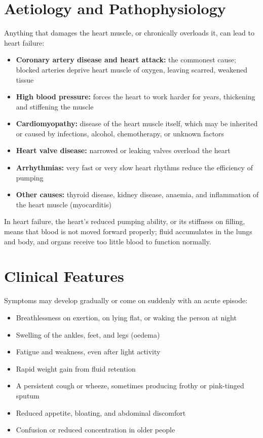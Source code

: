 \section*{Aetiology and Pathophysiology}
Anything that damages the heart muscle, or chronically overloads it, can lead to heart failure:
\begin{itemize}
    \item \textbf{Coronary artery disease and heart attack:} the commonest cause; blocked arteries deprive heart muscle of oxygen, leaving scarred, weakened tissue
    \item \textbf{High blood pressure:} forces the heart to work harder for years, thickening and stiffening the muscle
    \item \textbf{Cardiomyopathy:} disease of the heart muscle itself, which may be inherited or caused by infections, alcohol, chemotherapy, or unknown factors
    \item \textbf{Heart valve disease:} narrowed or leaking valves overload the heart
    \item \textbf{Arrhythmias:} very fast or very slow heart rhythms reduce the efficiency of pumping
    \item \textbf{Other causes:} thyroid disease, kidney disease, anaemia, and inflammation of the heart muscle (myocarditis)
\end{itemize}
In heart failure, the heart's reduced pumping ability, or its stiffness on filling, means that blood is not moved forward properly; fluid accumulates in the lungs and body, and organs receive too little blood to function normally.

\section*{Clinical Features}
Symptoms may develop gradually or come on suddenly with an acute episode:
\begin{itemize}
    \item Breathlessness on exertion, on lying flat, or waking the person at night
    \item Swelling of the ankles, feet, and legs (oedema)
    \item Fatigue and weakness, even after light activity
    \item Rapid weight gain from fluid retention
    \item A persistent cough or wheeze, sometimes producing frothy or pink-tinged sputum
    \item Reduced appetite, bloating, and abdominal discomfort
    \item Confusion or reduced concentration in older people
\end{itemize}

